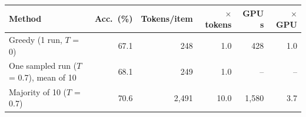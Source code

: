 \begin{tabular}{@{}lrrrrr@{}}
\toprule
Method & Acc.\ (\%) & Tokens/item & $\times$ tokens & GPU s & $\times$ GPU \\
\midrule
Greedy (1 run, $T$ = 0) & 67.1 & 248 & 1.0 & 428 & 1.0 \\
One sampled run ($T$ = 0.7), mean of 10 & 68.1 & 249 & 1.0 & -- & -- \\
Majority of 10 ($T$ = 0.7) & 70.6 & 2{,}491 & 10.0 & 1{,}580 & 3.7 \\
\bottomrule
\end{tabular}
